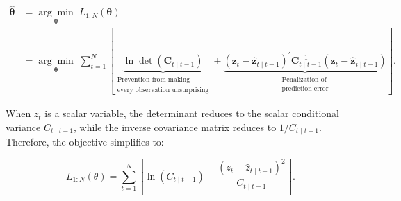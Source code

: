 \documentclass[11pt]{article}
\newcommand{\trans}{^{\prime}}
\begin{document}
\[
\begin{aligned}
\widehat{\boldsymbol{\theta}}
&=
\underset{\boldsymbol{\theta}}{\arg\min}
\;
L_{1:N}\!\left(\boldsymbol{\theta}\right)
\\[4pt]
&=
\underset{\boldsymbol{\theta}}{\arg\min}
\;
\sum_{t=1}^{N}
\left[
\underbrace{
\ln\det\!\left(\mathbf{C}_{t\mid t-1}\right)
}_{\substack{
\text{Prevention from making}\\
\text{every observation unsurprising}
}}
+
\underbrace{
\left(
\mathbf{z}_t-\widehat{\mathbf{z}}_{t\mid t-1}
\right)\trans
\mathbf{C}_{t\mid t-1}^{-1}
\left(
\mathbf{z}_t-\widehat{\mathbf{z}}_{t\mid t-1}
\right)
}_{\substack{
\text{Penalization of}\\
\text{prediction error}
}}
\right].
\end{aligned}
\]

When $z_t$ is a scalar variable, the determinant reduces to the scalar conditional variance $C_{t\mid t-1}$, while the inverse covariance matrix reduces to $1/C_{t\mid t-1}$. Therefore, the objective simplifies to:

\[
L_{1:N}(\theta)
=
\sum_{t=1}^{N}
\left[
\ln\!\left(C_{t\mid t-1}\right)
+
\frac{
\left(
z_t-\widehat{z}_{t\mid t-1}
\right)^2
}{
C_{t\mid t-1}
}
\right].
\]
\end{document}
